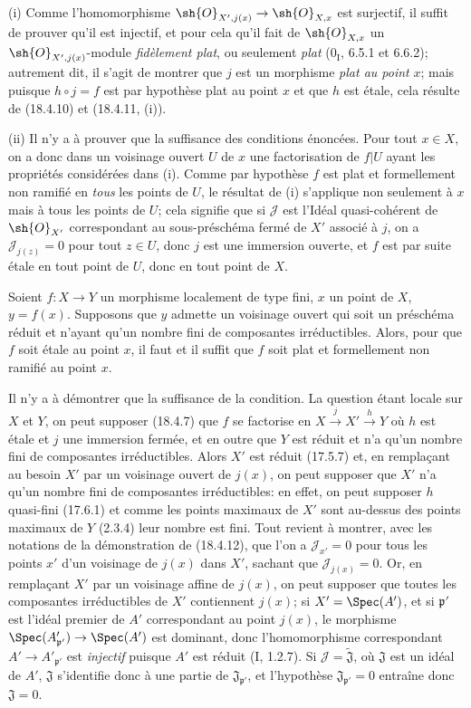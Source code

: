 (i) Comme l'homomorphisme $\sh{O}_{X',j(x)}\to\sh{O}_{X,x}$ est surjectif, il suffit de prouver qu'il est injectif, et pour cela qu'il fait de $\sh{O}_{X,x}$ un $\sh{O}_{X',j(x)}$-module \emph{fidèlement plat}, ou seulement \emph{plat} ($0_{\mathrm I}$, 6.5.1 et 6.6.2); autrement dit, il s'agit de montrer que $j$ est un morphisme \emph{plat au point} $x$; mais puisque $h\circ j=f$ est par hypothèse plat au point $x$ et que $h$ est étale, cela résulte de (18.4.10) et (18.4.11, (i)).

(ii) Il n'y a à prouver que la suffisance des conditions énoncées. Pour tout $x\in X$, on a donc dans un voisinage ouvert $U$ de $x$ une factorisation de $f|U$ ayant les propriétés considérées dans (i). Comme par hypothèse $f$ est plat et formellement non ramifié en \emph{tous} les points de $U$, le résultat de (i) s'applique non seulement à $x$ mais à tous les points de $U$; cela signifie que si $\mathscr J$ est l'Idéal quasi-cohérent de $\sh{O}_{X'}$ correspondant au sous-préschéma fermé de $X'$ associé à $j$, on a $\mathscr J_{j(z)}=0$ pour tout $z\in U$, donc $j$ est une immersion ouverte, et $f$ est par suite étale en tout point de $U$, donc en tout point de $X$.

\begin{corollary}[18.4.13]
\label{IV.18.4.13}
Soient $f:X\to Y$ un morphisme localement de type fini, $x$ un point de $X$, $y=f(x)$. Supposons que $y$ admette un voisinage ouvert qui soit un préschéma réduit et n'ayant qu'un nombre fini de composantes irréductibles. Alors, pour que $f$ soit étale au point $x$, il faut et il suffit que $f$ soit plat et formellement non ramifié au point $x$.
\end{corollary}

Il n'y a à démontrer que la suffisance de la condition. La question étant locale sur $X$ et $Y$, on peut supposer (18.4.7) que $f$ se factorise en $X\xrightarrow{j}X'\xrightarrow{h}Y$ où $h$ est étale et $j$ une immersion fermée, et en outre que $Y$ est réduit et n'a qu'un nombre fini de composantes irréductibles. Alors $X'$ est réduit (17.5.7) et, en remplaçant au besoin $X'$ par un voisinage ouvert de $j(x)$, on peut supposer que $X'$ n'a qu'un nombre fini de composantes irréductibles: en effet, on peut supposer $h$ quasi-fini (17.6.1) et comme les points maximaux de $X'$ sont au-dessus des points maximaux de $Y$ (2.3.4) leur nombre est fini. Tout revient à montrer, avec les notations de la démonstration de (18.4.12), que l'on a $\mathscr J_{x'}=0$ pour tous les points $x'$ d'un voisinage de $j(x)$ dans $X'$, sachant que $\mathscr J_{j(x)}=0$. Or, en remplaçant $X'$ par un voisinage affine de $j(x)$, on peut supposer que toutes les composantes irréductibles de $X'$ contiennent $j(x)$; si $X'=\Spec(A')$, et si $\mathfrak p'$ est l'idéal premier de $A'$ correspondant au point $j(x)$, le morphisme $\Spec(A'_{\mathfrak p'})\to\Spec(A')$ est dominant, donc l'homomorphisme correspondant $A'\to A'_{\mathfrak p'}$ est \emph{injectif} puisque $A'$ est réduit (I, 1.2.7). Si $\mathscr J=\widetilde{\mathfrak J}$, où $\mathfrak J$ est un idéal de $A'$, $\mathfrak J$ s'identifie donc à une partie de $\mathfrak J_{\mathfrak p'}$, et l'hypothèse $\mathfrak J_{\mathfrak p'}=0$ entraîne donc $\mathfrak J=0$.

